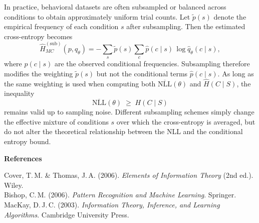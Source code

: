 \documentclass[11pt,a4paper]{article}
\begin{document}
In practice, behavioral datasets are often subsampled or balanced
across conditions to obtain approximately uniform trial counts.
Let $\tilde p(s)$ denote the empirical frequency of each condition $s$
after subsampling.
Then the estimated cross-entropy becomes
\[
\widehat{H}^{(\text{sub})}_{MC}(p,q_\theta)
= -\sum_s \tilde p(s)\!
   \sum_c \hat p(c\mid s)\, \log \widehat q_\theta(c\mid s),
\]
where $\hat p(c\mid s)$ are the observed conditional frequencies.
Subsampling therefore modifies the weighting $\tilde p(s)$
but not the conditional terms $\hat p(c\mid s)$.
As long as the same weighting is used when computing both
$\overline{\mathrm{NLL}}(\theta)$ and $\widehat H(C\mid S)$,
the inequality
\[
\overline{\mathrm{NLL}}(\theta)
\;\ge\; H(C\mid S)
\]
remains valid up to sampling noise.
Different subsampling schemes simply change the effective mixture of
conditions $s$ over which the cross-entropy is averaged,
but do not alter the theoretical relationship between
the NLL and the conditional entropy bound.

\vspace{1em}
\textbf{References}

Cover, T.\,M. \& Thomas, J.\,A. (2006).
\emph{Elements of Information Theory} (2nd ed.).
Wiley.\\
Bishop, C.\,M. (2006).
\emph{Pattern Recognition and Machine Learning}.
Springer.\\
MacKay, D.\,J.\,C. (2003).
\emph{Information Theory, Inference, and Learning Algorithms}.
Cambridge University Press.
\end{document}
